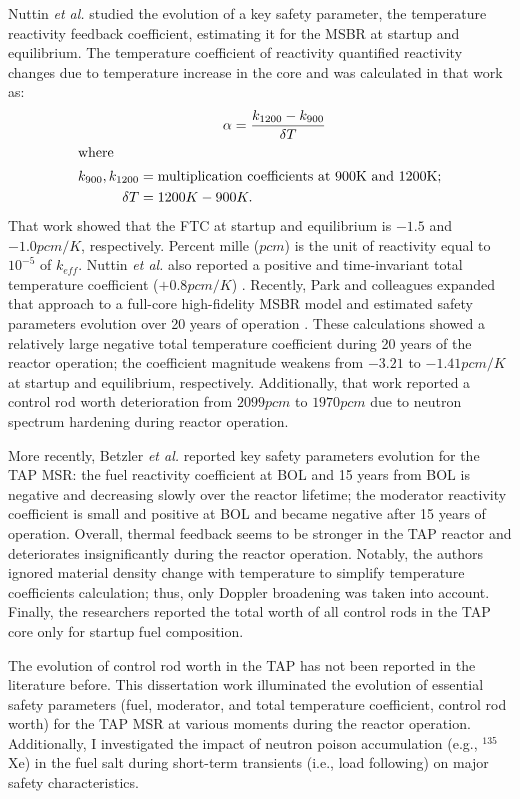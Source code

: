 Nuttin \emph{et al.} studied the evolution of a key safety parameter, the 
temperature reactivity feedback coefficient, estimating it for the \gls{MSBR} 
at startup and equilibrium. The temperature coefficient of reactivity 
quantified reactivity changes due to temperature increase in the core and was 
calculated in that work as:
\begin{align}\label{eq:feedback}
	& \qquad\qquad\qquad \alpha = \frac{k_{1200} - k_{900}}{\delta 
	T} \\
	\intertext{where}
	k_{900}, k_{1200}  &= \mbox{multiplication coefficients at 900K and 
		1200K;} 
	\nonumber \\
	\delta T &= 1200K-900K.\nonumber
\end{align}
That work showed that the \gls{FTC} at startup and equilibrium is $-1.5$ 
and $-1.0pcm/K$, respectively. Percent mille ($pcm$) is the unit of 
reactivity equal to $10^{-5}$ of $k_{eff}$. Nuttin \emph{et al.} also reported 
a positive and time-invariant total temperature coefficient ($+0.8pcm/K$) 
\cite{nuttin_potential_2005}. Recently, Park and colleagues expanded that 
approach to a full-core high-fidelity \gls{MSBR} model and estimated safety 
parameters evolution over 20 years of operation \cite{park_whole_2015}. These 
calculations showed a relatively large negative total temperature coefficient 
during 20 years of the reactor operation; the coefficient magnitude weakens 
from $-3.21$ to $-1.41pcm/K$ at startup and equilibrium, respectively. 
Additionally, that work reported a control rod worth deterioration 
from $2099pcm$ to $1970pcm$ due to neutron spectrum hardening during reactor 
operation. 

More recently, Betzler \emph{et al.} \cite{betzler_assessment_2017-1} reported 
key safety parameters evolution for the \gls{TAP} \gls{MSR}: the fuel 
reactivity coefficient at \gls{BOL} and 15 years from \gls{BOL} is negative 
and decreasing slowly over the reactor lifetime; the moderator reactivity 
coefficient is small and positive at \gls{BOL} and became negative after 15 
years of operation. Overall, thermal feedback seems to be stronger in the 
\gls{TAP} reactor and deteriorates insignificantly during the reactor 
operation. Notably, the authors ignored material density change with 
temperature to simplify temperature coefficients calculation; thus, only  
Doppler broadening was taken into account. Finally, the researchers reported 
the total worth of all control rods in the \gls{TAP} core only for startup 
fuel composition. 

The evolution of control rod worth in the \gls{TAP} has not been reported in 
the literature before. This dissertation work illuminated the evolution of  
essential safety parameters (fuel, moderator, and total temperature 
coefficient, control rod worth) for the \gls{TAP} \gls{MSR} at various moments 
during the reactor operation. Additionally, I investigated the impact of 
neutron poison accumulation (e.g., $^{135}$Xe) in the fuel salt during 
short-term transients (i.e., load following) on major safety characteristics.


